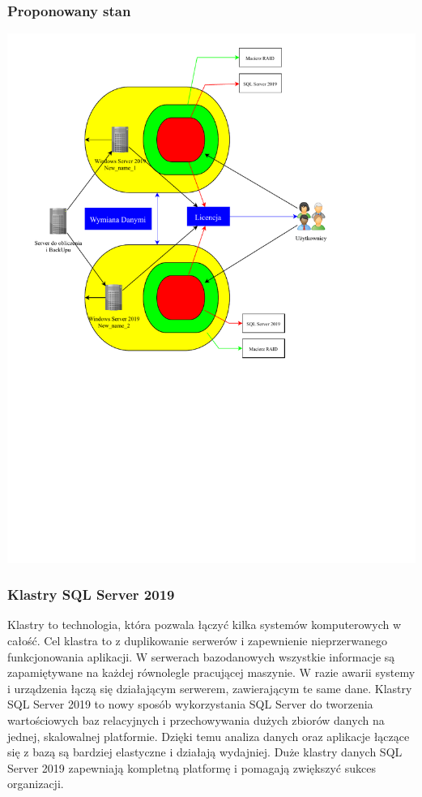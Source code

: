 \documentclass[a4paper, 12pt]{article}
\begin{document}
			  	\subsubsection{Proponowany stan}
			  	\includegraphics[scale=0.7]{proponowany_stan} \newline
				\subsubsection{Klastry SQL Server 2019} 	
	\hspace*{1cm} Klastry to technologia, która pozwala łączyć kilka systemów komputerowych w całość. 
Cel klastra to z duplikowanie  serwerów i zapewnienie nieprzerwanego funkcjonowania aplikacji. W serwerach bazodanowych wszystkie informacje są zapamiętywane na każdej równolegle pracującej maszynie. W razie awarii systemy i urządzenia łączą się działającym serwerem, zawierającym te same dane.
\newline
	\hspace*{1cm}Klastry SQL Server 2019 to nowy sposób wykorzystania SQL Server do tworzenia wartościowych baz relacyjnych i przechowywania dużych zbiorów danych na jednej, skalowalnej platformie. Dzięki temu analiza danych oraz aplikacje łączące się z bazą są bardziej elastyczne i działają wydajniej. Duże klastry danych SQL Server 2019 zapewniają kompletną platformę i pomagają zwiększyć sukces  organizacji.
\end{document}

